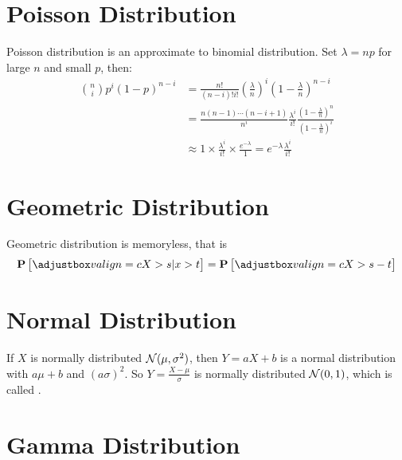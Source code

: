 \section{Poisson Distribution}

Poisson distribution is an approximate to binomial distribution. Set $\lambda = n p $ for large $n$ and small $p$, then:
\begin{equation*}
    \begin{aligned}
        \binom{n}{i}p^i (1-p)^{n-i} &= \frac{n!}{(n-i)! i!} \left(\frac{\lambda}{n} \right)^i \left(1-\frac{\lambda}{n} \right)^{n-i} \\
        &= \frac{n (n-1) \cdots (n - i + 1)}{n^i} \frac{\lambda^i}{i!} \frac{(1- \frac{\lambda}{n})^n}{(1- \frac{\lambda}{n})^i} \\
        & \approx 1 \times \frac{\lambda^i}{i!} \times \frac{e^{- \lambda}}{1} = e^{- \lambda} \frac{\lambda^i}{ i !}
    \end{aligned}
\end{equation*}


\section{Geometric Distribution}

Geometric distribution is memoryless, that is 
\begin{equation}
    \probability{X > s | x > t} = \probability{X > s - t}
\end{equation}


\section{Normal Distribution}

\begin{theorem}
    If $X$ is normally distributed $\mathcal{N}(\mu,\sigma^2)$, then $Y = aX + b$ is a normal distribution with $a\mu + b$ and $(a\sigma)^2$. So $Y =\displaystyle \frac{X - \mu}{\sigma}$ is normally distributed $\mathcal{N}(0,1)$, which is called .
\end{theorem}



\section{Gamma Distribution}

